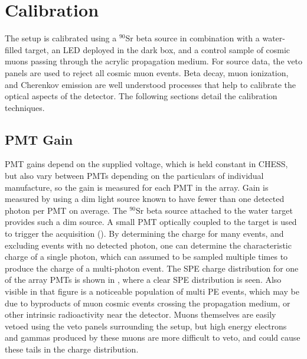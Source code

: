 \section{Calibration}
\label{sec:calibration}

The setup is calibrated using a $^{90}$Sr beta source in combination with a water-filled target, an LED deployed in the dark box, and a control sample of cosmic muons passing through the acrylic propagation medium. 
For source data, the veto panels are used to reject all cosmic muon events. 
Beta decay, muon ionization, and Cherenkov emission are well understood processes that help to calibrate the optical aspects of the detector. 
The following sections detail the calibration techniques.

\subsection{PMT Gain}
\label{pmt-gain}
PMT gains depend on the supplied voltage, which is held constant in CHESS, but also vary between PMTs depending on the particulars of individual manufacture, so the gain is measured for each PMT in the array. 
Gain is measured by using a dim light source known to have fewer than one detected photon per PMT on average.
The $^{90}$Sr beta source attached to the water target provides such a dim source.
A small PMT optically coupled to the target is used to trigger the acquisition (). 
By determining the charge for many events, and excluding events with no detected photon, one can determine the characteristic charge of a single photon, which can assumed to be sampled multiple times to produce the charge of a multi-photon event.
The SPE charge distribution for one of the array PMTs  is shown in , where a clear SPE distribution is seen. 
Also visible in that figure is a noticeable population of multi PE events, which may be due to byproducts of muon cosmic events crossing the propagation medium, or other intrinsic radioactivity near the detector. 
Muons themselves are easily vetoed using the veto panels surrounding the setup, but high energy electrons and gammas produced by these muons are more difficult to veto, and could cause these tails in the charge distribution. 


